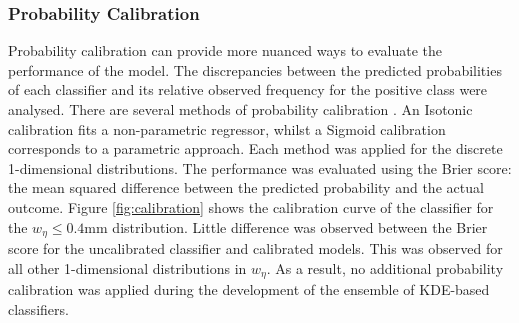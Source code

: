 \subsubsection{Probability Calibration}


Probability calibration can provide more nuanced ways to evaluate the performance of the model. The discrepancies between the predicted probabilities of each classifier and its relative observed frequency for the positive class were analysed. There are several methods of probability calibration \cite{prob-calibration}. An Isotonic calibration fits a non-parametric regressor, whilst a Sigmoid calibration corresponds to a parametric approach. Each method was applied for the discrete 1-dimensional distributions. The performance was evaluated using the Brier score: the mean squared difference between the predicted probability and the actual outcome. Figure \ref{fig:calibration} shows the calibration curve of the classifier for the $w_{\eta} \leq 0.4$mm distribution. Little difference was observed between the Brier score for the uncalibrated classifier and calibrated models. This was observed for all other 1-dimensional distributions in $w_{\eta}$. As a result, no additional probability calibration was applied during the development of the ensemble of KDE-based classifiers.


